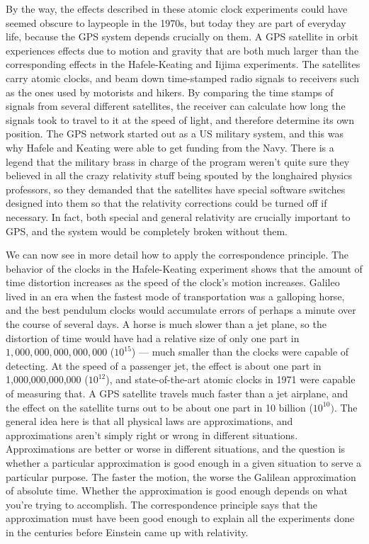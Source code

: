 By the way, the effects described in these atomic clock experiments could have seemed obscure
to laypeople in the 1970s, but today they are part of everyday life, because the GPS system depends
crucially on them. A GPS satellite in orbit experiences effects due to motion and gravity that are both
much larger than the corresponding effects in the Hafele-Keating and Iijima experiments. The satellites carry
atomic clocks, and beam down time-stamped
radio signals to  receivers such as the ones used by motorists and hikers.
By comparing the time stamps of signals from several different satellites, the receiver can calculate
how long the signals took to travel to it at the speed of light, and therefore determine its own position.
The GPS network started out as a US military system, and this was why Hafele and Keating were able to get
funding from the Navy. There is a legend that the military brass in charge of the program weren't quite sure
they believed in all the crazy relativity stuff being spouted by the longhaired physics professors, so they
demanded that the satellites have special software switches designed into them so that the relativity corrections
could be turned off if necessary. In fact, both special and general relativity are crucially important to GPS,
and the system would be completely broken without them.




We can now see in more detail how to apply the correspondence principle. The behavior of the clocks in the
Hafele-Keating experiment shows that the amount of time distortion increases as the speed of the clock's motion
increases. Galileo lived in an era when the fastest
mode of transportation was a galloping horse, and the best
pendulum clocks would accumulate errors of perhaps a minute over the course of several days.
A horse is much slower than a jet plane, so the
distortion of time would have had a relative size of only one part in $1,000,000,000,000,000$ ($10^{15}$)
--- much smaller than the clocks were capable of detecting.
At the speed of a passenger jet, the effect is about one part in 1,000,000,000,000 ($10^{12}$),
and state-of-the-art atomic clocks in 1971 were capable of measuring that.
A GPS satellite travels much faster than a jet airplane, and the effect on the satellite
turns out to be about one part in 10 billion ($10^{10})$. The general idea here is that all physical laws are approximations, and
approximations aren't simply right or wrong in different situations. Approximations are better or worse
in different situations, and the question is whether a particular approximation is good enough in a given
situation to serve a particular purpose. The faster the motion, the worse the Galilean approximation of
absolute time. Whether the approximation is good enough depends on what you're trying to accomplish.
The correspondence principle says that the approximation must have been good enough to explain
all the experiments done in the centuries before Einstein came up with relativity.


